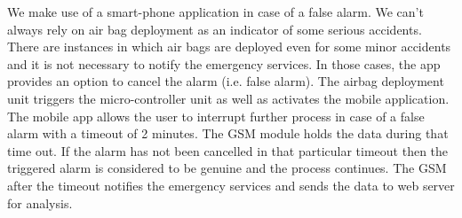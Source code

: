 We make use of a smart-phone application in case of a false alarm. We can't always rely on air bag deployment as an indicator of some serious accidents. There are instances in which air bags are deployed even for some minor accidents and it is not necessary to notify the emergency services. In those cases, the app provides an option to cancel the alarm (i.e. false alarm). The airbag deployment unit triggers the micro-controller unit as well as activates the mobile application. The mobile app allows the user to interrupt further process in case of a false alarm with a timeout of 2 minutes. The GSM module holds the data during that time out. If the alarm has not been cancelled in that particular timeout then the triggered alarm is considered to be genuine and the process continues. The GSM after the timeout notifies the emergency services and sends the data to web server for analysis.




